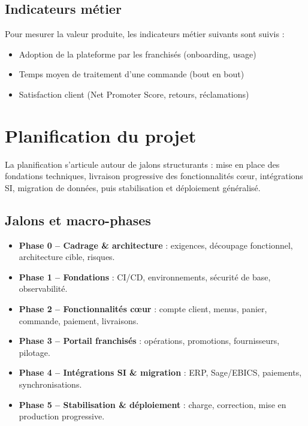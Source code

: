 \section{Indicateurs métier}
Pour mesurer la valeur produite, les indicateurs métier suivants sont suivis :
\begin{itemize}
    \item Adoption de la plateforme par les franchisés (onboarding, usage)
    \item Temps moyen de traitement d’une commande (bout en bout)
    \item Satisfaction client (Net Promoter Score, retours, réclamations)
\end{itemize}


\chapter{Planification du projet}

La planification s’articule autour de jalons structurants : mise en place des fondations techniques, livraison progressive des fonctionnalités cœur, intégrations SI, migration de données, puis stabilisation et déploiement généralisé.

\section{Jalons et macro-phases}
\begin{itemize}
    \item \textbf{Phase 0 -- Cadrage \& architecture} : exigences, découpage fonctionnel, architecture cible, risques.
    \item \textbf{Phase 1 -- Fondations} : CI/CD, environnements, sécurité de base, observabilité.
    \item \textbf{Phase 2 -- Fonctionnalités cœur} : compte client, menus, panier, commande, paiement, livraisons.
    \item \textbf{Phase 3 -- Portail franchisés} : opérations, promotions, fournisseurs, pilotage.
    \item \textbf{Phase 4 -- Intégrations SI \& migration} : ERP, Sage/EBICS, paiements, synchronisations.
    \item \textbf{Phase 5 -- Stabilisation \& déploiement} : charge, correction, mise en production progressive.
\end{itemize}

